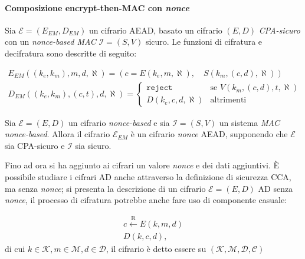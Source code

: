 \paragraph{Composizione encrypt-then-MAC con \emph{nonce}}
Sia $\mathcal{E} = (E_{EM},D_{EM})$ un cifrario AEAD, basato un cifrario $(E,D)$ \emph{CPA-sicuro} con un \emph{nonce-based MAC}  $ \mathcal{I} = (S,V)$ sicuro. Le funzioni di cifratura e decifratura sono descritte di seguito:

\begin{gather*}
    E_{EM}( (k_e,k_m),m,d,\aleph) = ( c = E(k_e, m,\aleph), \quad S(k_m,(c,d),\aleph))\\
    D_{EM}((k_e,k_m),(c,t),d,\aleph) = \begin{cases}
        \texttt{reject} & \text{se } V(k_m,(c,d),t,\aleph)\\
        D(k_e,c,d,\aleph) & \text{altrimenti}
    \end{cases}
\end{gather*}

\begin{theorem}
    Sia $\mathcal{E} = (E,D)$ un cifrario \emph{nonce-based} e sia $\mathcal{I} = (S,V)$ un sistema \emph{MAC nonce-based}. Allora il cifrario $\mathcal{E}_{EM}$ è un cifrario \emph{nonce} AEAD, supponendo che $\mathcal{E}$ sia CPA-sicuro e $\mathcal{I}$ sia sicuro. 
\end{theorem}

Fino ad ora si ha aggiunto ai cifrari un valore \emph{nonce} e dei dati aggiuntivi. È possibile studiare i cifrari AD anche attraverso la definizione di sicurezza CCA, ma senza \emph{nonce}; si presenta la descrizione di un cifrario $\mathcal{E} = (E,D)$ AD senza \emph{nonce}, il processo di cifratura potrebbe anche fare uso di componente casuale:

\begin{gather*}
    c \xleftarrow{\text{R}} E(k, m, d)\\
    D(k, c, d),
\end{gather*}
di cui $k \in \mathcal{K}, m \in \mathcal{M}, d \in \mathcal{D}$, il cifrario è detto essere su $(\mathcal{K},\mathcal{M},\mathcal{D},\mathcal{C})$

